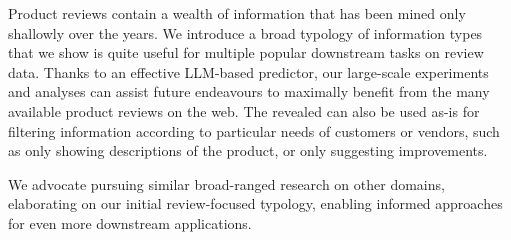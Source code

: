 Product reviews contain a wealth of information that has been mined only shallowly over the years. 
We introduce a broad typology of information types that we show is quite useful for multiple popular downstream tasks on review data.
Thanks to an effective LLM-based predictor, our large-scale experiments and analyses can assist future endeavours to maximally benefit from the many available product reviews on the web. 
The revealed \taxtypes{} can also be used as-is for filtering information according to particular needs of customers or vendors, such as only showing descriptions of the product, or only suggesting improvements.

We advocate pursuing similar broad-ranged research on other domains, elaborating on our initial review-focused typology, enabling informed approaches for even more downstream applications. 


